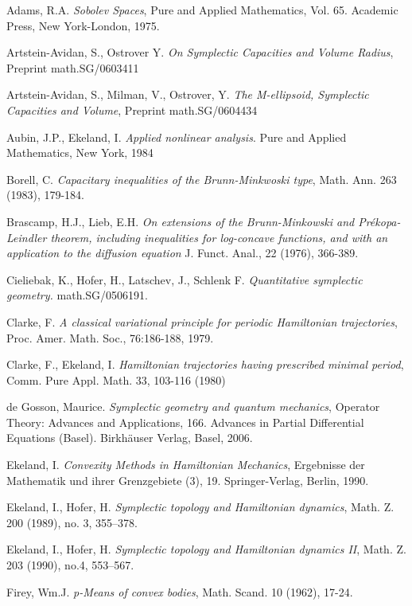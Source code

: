 \documentclass[12pt]{article}
\begin{document}
\begin{thebibliography}{}

 Adams, R.A. {\it Sobolev Spaces}, Pure and Applied Mathematics, Vol. 65. Academic Press, New York-London, 1975.

 Artstein-Avidan, S., Ostrover Y. {\it On Symplectic
Capacities and Volume Radius}, Preprint math.SG/0603411

Artstein-Avidan, S., Milman, V., Ostrover, Y. {\it The M-ellipsoid,
Symplectic Capacities and Volume}, Preprint math.SG/0604434

 Aubin, J.P., Ekeland, I. {\it Applied nonlinear analysis}. Pure and Applied Mathematics, New York, 1984

 Borell, C. {\it Capacitary inequalities of the
Brunn-Minkwoski type}, Math. Ann. 263 (1983), 179-184.

 Brascamp, H.J., Lieb,  E.H. {\it On extensions of the
Brunn-Minkowski and Pr\'{e}kopa-Leindler theorem, including
inequalities for log-concave functions, and with an application to
the diffusion equation}  J. Funct. Anal., 22  (1976), 366-389.

 Cieliebak, K., Hofer, H., Latschev, J., Schlenk
F. {\it Quantitative symplectic geometry.} math.SG/0506191.

 Clarke, F. {\it A classical variational principle for
periodic Hamiltonian trajectories}, Proc. Amer. Math. Soc.,
76:186-188, 1979.

 Clarke, F., Ekeland, I. {\it Hamiltonian trajectories
having prescribed minimal period}, Comm. Pure Appl. Math. 33, 103-116 (1980)

 de Gosson, Maurice. {\it Symplectic geometry and quantum mechanics}, Operator Theory: Advances and Applications, 166.
Advances in Partial Differential Equations (Basel). Birkh\"auser Verlag, Basel, 2006.


 Ekeland, I. {\it Convexity Methods in Hamiltonian
Mechanics}, Ergebnisse der Mathematik und ihrer Grenzgebiete (3), 19. Springer-Verlag, Berlin, 1990.

 Ekeland, I., Hofer, H. {\it Symplectic topology
and Hamiltonian dynamics}, Math. Z. 200 (1989), no. 3,
355--378.

 Ekeland, I., Hofer, H. {\it Symplectic topology
and Hamiltonian dynamics II}, Math. Z.  203 (1990), no.4, 553--567.

 Firey, Wm.J. {\it p-Means of convex bodies}, Math. Scand. 10 (1962), 17-24.


\end{thebibliography}
\end{document}
